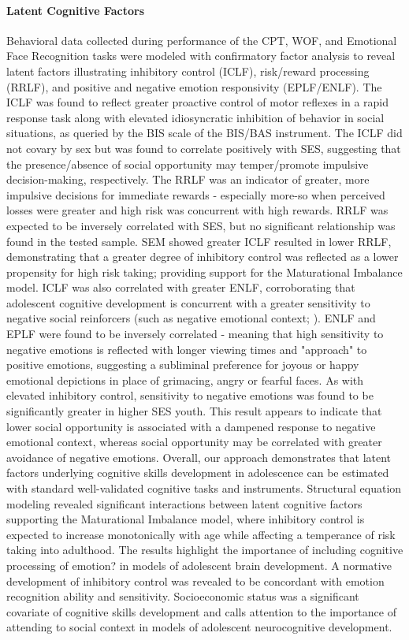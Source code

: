 \documentclass[utf8]{frontiersSCNS} %
\begin{document}
\paragraph*{Latent Cognitive Factors} Behavioral data collected during performance of the CPT, WOF, and Emotional Face Recognition tasks were modeled with confirmatory factor analysis to reveal latent factors illustrating inhibitory control (ICLF), risk/reward processing (RRLF), and positive and negative emotion responsivity (EPLF/ENLF). The ICLF was found to reflect greater proactive control of motor reflexes in a rapid response task along with elevated idiosyncratic inhibition of behavior in social situations, as queried by the BIS scale of the BIS/BAS instrument. The ICLF did not covary by sex but was found to correlate positively with SES, suggesting that the presence/absence of social opportunity may temper/promote impulsive decision-making, respectively. The RRLF was an indicator of greater, more impulsive decisions for immediate rewards - especially more-so when perceived losses were greater and high risk was concurrent with high rewards. RRLF was expected to be inversely correlated with SES, but no significant relationship was found in the tested sample. SEM showed greater ICLF resulted in lower RRLF, demonstrating that a greater degree of inhibitory control was reflected as a lower propensity for high risk taking; providing support for the Maturational Imbalance model. ICLF was also correlated with greater ENLF, corroborating that adolescent cognitive development is concurrent with a greater sensitivity to negative social reinforcers (such as negative emotional context; \cite{jones2014adolescent, rosenbaum2020valence}). ENLF and EPLF were found to be inversely correlated - meaning that high sensitivity to negative emotions is reflected with longer viewing times and "approach" to positive emotions, suggesting a subliminal preference for joyous or happy emotional depictions in place of grimacing, angry or fearful faces. As with elevated inhibitory control, sensitivity to negative emotions was found to be significantly greater in higher SES youth. This result appears to indicate that lower social opportunity is associated with a dampened response to negative emotional context, whereas social opportunity may be correlated with greater avoidance of negative emotions. 
Overall, our approach demonstrates that latent factors underlying cognitive skills development in adolescence can be estimated with standard well-validated cognitive tasks and instruments. Structural equation modeling revealed significant interactions between latent cognitive factors supporting the Maturational Imbalance model, where inhibitory control is expected to increase monotonically with age while affecting a temperance of risk taking into adulthood. The results highlight the importance of including cognitive processing of emotion? in models of adolescent brain development. A normative development of inhibitory control was revealed to be concordant with emotion recognition ability and sensitivity. Socioeconomic status was a significant covariate of cognitive skills development and calls attention to the importance of attending to social context in models of adolescent neurocognitive development.
\vspace{2pt}
\end{document}
